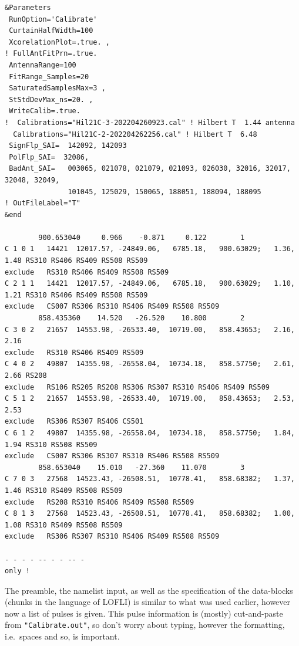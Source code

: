 \begin{linenumbers}
\resetlinenumber
\begin{verbatim}
&Parameters
 RunOption='Calibrate'
 CurtainHalfWidth=100
 XcorelationPlot=.true. ,
! FullAntFitPrn=.true.
 AntennaRange=100
 FitRange_Samples=20
 SaturatedSamplesMax=3 ,
 StStdDevMax_ns=20. ,
 WriteCalib=.true.
!  Calibrations="Hil21C-3-202204260923.cal" ! Hilbert T  1.44 antenna
  Calibrations="Hil21C-2-202204262256.cal" ! Hilbert T  6.48
 SignFlp_SAI=  142092, 142093
 PolFlp_SAI=  32086,
 BadAnt_SAI=   003065, 021078, 021079, 021093, 026030, 32016, 32017, 32048, 32049,
               101045, 125029, 150065, 188051, 188094, 188095
! OutFileLabel="T"
&end

        900.653040     0.966    -0.871     0.122        1
C 1 0 1   14421  12017.57, -24849.06,   6785.18,   900.63029;   1.36,   1.48 RS310 RS406 RS409 RS508 RS509
exclude   RS310 RS406 RS409 RS508 RS509
C 2 1 1   14421  12017.57, -24849.06,   6785.18,   900.63029;   1.10,   1.21 RS310 RS406 RS409 RS508 RS509
exclude   CS007 RS306 RS310 RS406 RS409 RS508 RS509
        858.435360    14.520   -26.520    10.800        2
C 3 0 2   21657  14553.98, -26533.40,  10719.00,   858.43653;   2.16,   2.16
exclude   RS310 RS406 RS409 RS509
C 4 0 2   49807  14355.98, -26558.04,  10734.18,   858.57750;   2.61,   2.66 RS208
exclude   RS106 RS205 RS208 RS306 RS307 RS310 RS406 RS409 RS509
C 5 1 2   21657  14553.98, -26533.40,  10719.00,   858.43653;   2.53,   2.53
exclude   RS306 RS307 RS406 CS501
C 6 1 2   49807  14355.98, -26558.04,  10734.18,   858.57750;   1.84,   1.94 RS310 RS508 RS509
exclude   CS007 RS306 RS307 RS310 RS406 RS508 RS509
        858.653040    15.010   -27.360    11.070        3
C 7 0 3   27568  14523.43, -26508.51,  10778.41,   858.68382;   1.37,   1.46 RS310 RS409 RS508 RS509
exclude   RS208 RS310 RS406 RS409 RS508 RS509
C 8 1 3   27568  14523.43, -26508.51,  10778.41,   858.68382;   1.00,   1.08 RS310 RS409 RS508 RS509
exclude   RS306 RS307 RS310 RS406 RS409 RS508 RS509

- - - - -- - - -- -
only !
\end{verbatim}
\end{linenumbers}

The preamble, the namelist input, as well as the specification of the data-blocks (chunks in the language of LOFLI) is similar to what was used earlier, however now a list of pulses is given. This pulse information is (mostly) cut-and-paste from \verb!"Calibrate.out"!, so don't worry about typing, however the formatting, i.e.\ spaces and so, is important.

